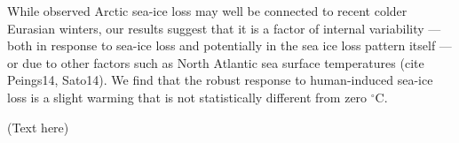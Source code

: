 \documentclass[grl]{AGUTeX}  %
\begin{document}
\begin{article}
While observed Arctic sea-ice loss may well be connected to recent colder Eurasian winters, our results suggest that it is a factor of internal variability --- both in response to sea-ice loss and potentially in the sea ice loss pattern itself --- or due to other factors such as North Atlantic sea surface temperatures (cite Peings14, Sato14). We find that the robust response to human-induced sea-ice loss is a slight warming that is not statistically different from zero $^\circ$C.


%
%
%
%
%
%
%

\begin{acknowledgments}
(Text here)
\end{acknowledgments}

%
%
%
%
%
%
%
%
%


\end{article}
\end{document}

